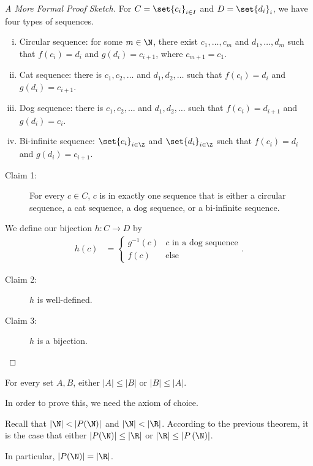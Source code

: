 \documentclass[10pt]{mypackage}
\begin{document}
\begin{proof}[A More Formal Proof Sketch]
  For $C = \set{c_i}_{i\in I}$ and $D = \set{d_i}_{i}$, we have four types of sequences.
  \begin{enumerate}[(i)]
    \item Circular sequence: for some $m\in\N$, there exist $c_1,\dots,c_m$ and $d_1,\dots,d_m$ such that $f\left(c_i\right) = d_i$ and $g\left(d_i\right) = c_{i+1}$, where $c_{m+1} = c_1$.
    \item Cat sequence: there is $c_1,c_2,\dots$ and $d_1,d_2,\dots$ such that $f(c_i) = d_i$ and $g(d_i) = c_{i+1}$.
    \item Dog sequence: there is $c_1,c_2,\dots$ and $d_1,d_2,\dots$ such that $f\left(c_i\right) = d_{i+1}$ and $g\left(d_i\right) = c_{i}$.
    \item Bi-infinite sequence: $\set{c_i}_{i\in \Z}$ and $\set{d_i}_{i\in\Z}$ such that $f\left(c_i\right) = d_i$ and $g\left(d_i\right) = c_{i+1}$.
  \end{enumerate}
  \begin{description}
    \item[Claim 1:] For every $c\in C$, $c$ is in exactly one sequence that is either a circular sequence, a cat sequence, a dog sequence, or a bi-infinite sequence.
  \end{description}
  We define our bijection $h: C\rightarrow D$ by
  \begin{align*}
    h(c) &= \begin{cases}
      g^{-1}\left(c\right) & \text{$c$ in a dog sequence}\\
      f(c) & \text{else}
    \end{cases}.
  \end{align*}
  \begin{description}
    \item[Claim 2:] $h$ is well-defined.
    \item[Claim 3:] $h$ is a bijection.
  \end{description}
\end{proof}
\begin{theorem}
  For every set $A,B$, either $|A| \leq |B|$ or $|B| \leq |A|$.\newline

  In order to prove this, we need the axiom of choice.
\end{theorem}
\begin{example}
  Recall that $|\N| < |P(\N)|$ and $|\N| < |\R|$. According to the previous theorem, it is the case that either $\left\vert P(\N) \right\vert \leq |\R|$ or $\left\vert \R \right\vert\leq \left\vert P\left(\N\right) \right\vert$.\newline

  In particular, $\left\vert P(\N) \right\vert = \left\vert \R \right\vert$.
\end{example}
\end{document}
